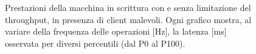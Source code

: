 \begin{figure}[htbp]
    \caption{Prestazioni della macchina in scrittura con e senza limitazione del throughput, in presenza di client malevoli. Ogni grafico mostra, al variare della frequenza delle operazioni [Hz], la latenza [ms] osservata per diversi percentili (dal P0 al P100).}
    \label{fig:bench-throttling}
\end{figure}
